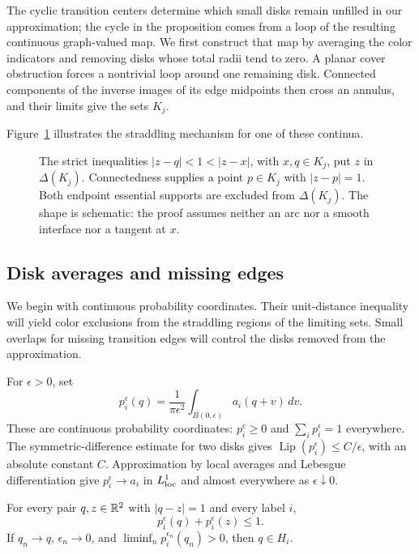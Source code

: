 The cyclic transition centers determine which small disks remain
unfilled in our approximation; the cycle in the proposition comes from a
loop of the resulting continuous graph-valued map.  We first construct
that map by averaging the color indicators and removing disks whose
total radii tend to zero.  A planar cover obstruction forces a nontrivial
loop around one remaining disk.  Connected components of the inverse
images of its edge midpoints then cross an annulus, and their limits give
the sets $K_j$.

Figure~\ref{fig:exclusion-continuum} illustrates the straddling mechanism
for one of these continua.

\begin{figure}[htbp]
\centering

\caption{The strict inequalities $|z-q|<1<|z-x|$, with $x,q\in K_j$,
put $z$ in $\Delta(K_j)$. Connectedness supplies a point $p\in K_j$
with $|z-p|=1$. Both endpoint essential supports are excluded from $\Delta(K_j)$. The shape is schematic: the proof assumes neither an arc nor
a smooth interface nor a tangent at $x$.}
\label{fig:exclusion-continuum}
\end{figure}

\subsection{Disk averages and missing edges}

We begin with continuous probability coordinates.  Their unit-distance
inequality will yield color exclusions from the straddling regions of
the limiting sets.  Small overlaps for missing transition edges will
control the disks removed from the approximation.

For $\epsilon>0$, set
\[
 p_i^\epsilon(q)=\frac1{\pi\epsilon^2}
                     \int_{B(0,\epsilon)}a_i(q+v)\,dv.
\]
These are continuous probability coordinates:
$p_i^\epsilon\ge0$ and $\sum_i p_i^\epsilon=1$ everywhere.
The symmetric-difference estimate for two disks gives
$\operatorname{Lip}(p_i^\epsilon)\le C/\epsilon$, with an absolute
constant $C$.  Approximation by local averages and Lebesgue
differentiation give $p_i^\epsilon\to a_i$ in $L^1_{\rm loc}$ and
almost everywhere as $\epsilon\downarrow0$.

\begin{lemma}
\label{lem:transitions-disk-averages}
For every pair $q,z\in\mathbb R^2$ with $|q-z|=1$ and every label $i$,
\begin{equation}
 p_i^\epsilon(q)+p_i^\epsilon(z)\le1.
 \label{eq:source-17}
\end{equation}
If $q_n\to q$, $\epsilon_n\to0$, and
$\liminf_n p_i^{\epsilon_n}(q_n)>0$, then $q\in H_i$.
\end{lemma}


